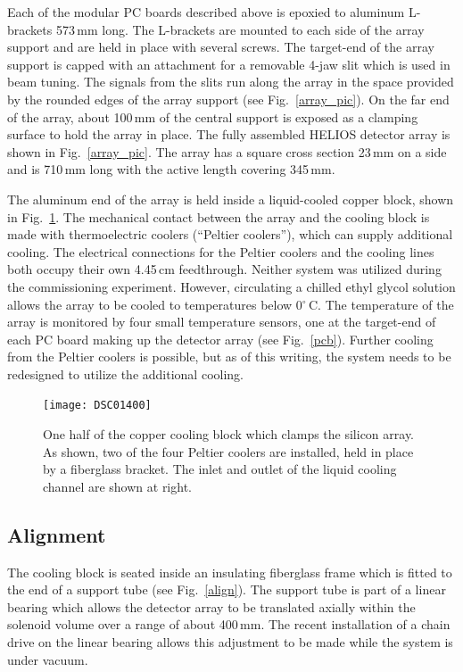 Each of the modular PC boards described above is epoxied to aluminum L-brackets 573\,mm long.  The L-brackets are mounted to each side of the array support and are held in place with several screws.  The target-end of the array support is capped with an attachment for a removable 4-jaw slit which is used in beam tuning.  The signals from the slits run along the array in the space provided by the rounded edges of the array support (see Fig.~\ref{array_pic}).  On the far end of the array, about 100\,mm of the central support is exposed as a clamping surface to hold the array in place.  The fully assembled HELIOS detector array is shown in Fig.~\ref{array_pic}.  The array has a square cross section 23\,mm on a side and is 710\,mm long with the active length covering 345\,mm. 

  The aluminum end of the array is held inside a liquid-cooled copper block, shown in Fig.~\ref{block}.  The mechanical contact between the array and the cooling block is made with thermoelectric coolers (``Peltier coolers''), which can supply additional cooling.  The electrical connections for the Peltier coolers and the cooling lines both occupy their own 4.45\,cm feedthrough.  Neither system was utilized during the commissioning experiment.  However, circulating a chilled ethyl glycol solution allows the array to be cooled to temperatures below 0$^\circ$\,C.  The temperature of the array is monitored by four small temperature sensors, one at the target-end of each PC board making up the detector array (see Fig.~\ref{pcb}).  Further cooling from the Peltier coolers is possible, but as of this writing, the system needs to be redesigned to utilize the additional cooling.  

\begin{figure}%
\centering
\texttt{[image: DSC01400]}%
\caption[One half of the copper cooling block which clamps the silicon array]{One half of the copper cooling block which clamps the silicon array.  As shown, two of the four Peltier coolers are installed, held in place by a fiberglass bracket.  The inlet and outlet of the liquid cooling channel are shown at right.}%
\label{block}%
\end{figure}

\subsection{Alignment}
The cooling block is seated inside an insulating fiberglass frame which is fitted to the end of a support tube (see Fig.~\ref{align}).  The support tube is part of a linear bearing which allows the detector array to be translated axially within the solenoid volume over a range of about 400\,mm.  The recent installation of a chain drive on the linear bearing allows this adjustment to be made while the system is under vacuum.

